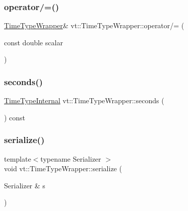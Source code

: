 \mbox{\label{structvt_1_1_time_type_wrapper_ad036b5d8434bd1771cd191fdc438396f}} 
\subsubsection{\texorpdfstring{operator/=()}{operator/=()}}
{\footnotesize\ttfamily \hyperlink{structvt_1_1_time_type_wrapper}{Time\+Type\+Wrapper}\& vt\+::\+Time\+Type\+Wrapper\+::operator/= (\begin{DoxyParamCaption}\item[{const double}]{scalar }\end{DoxyParamCaption})\hspace{0.3cm}{\ttfamily [inline]}}

\mbox{\label{structvt_1_1_time_type_wrapper_ae2979e22f260de5316d96b999a4cc4c2}} 
\subsubsection{\texorpdfstring{seconds()}{seconds()}}
{\footnotesize\ttfamily \hyperlink{structvt_1_1_time_type_wrapper_a932f8d925e6c43e898fb8761ea667ef1}{Time\+Type\+Internal} vt\+::\+Time\+Type\+Wrapper\+::seconds (\begin{DoxyParamCaption}{ }\end{DoxyParamCaption}) const\hspace{0.3cm}{\ttfamily [inline]}}

\mbox{\label{structvt_1_1_time_type_wrapper_aa5c7311e8b108c65a4af7118163f18c8}} 
\subsubsection{\texorpdfstring{serialize()}{serialize()}}
{\footnotesize\ttfamily template$<$typename Serializer $>$ \\
void vt\+::\+Time\+Type\+Wrapper\+::serialize (\begin{DoxyParamCaption}\item[{Serializer \&}]{s }\end{DoxyParamCaption})\hspace{0.3cm}{\ttfamily [inline]}}



